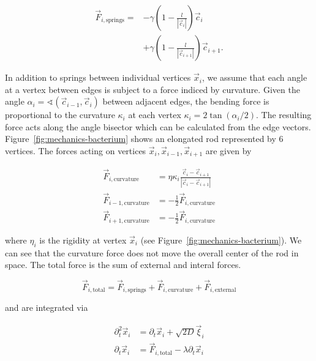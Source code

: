 \documentclass{article}
\begin{document}
\begin{align}
    \vec{F}_{i,\text{springs}} =
        &-\gamma\left(1 - \frac{l}{\left|\vec{c}_i\right|}\right)
        \vec{c}_i\\
        &+ \gamma\left(1 - \frac{l}{\left|\vec{c}_{i+1}\right|}\right)
        \vec{c}_{i+1}.
\end{align}

In addition to springs between individual vertices $\vec{x}_i$, we assume that each angle at a
vertex between edges is subject to a force indiced by curvature.
Given the angle $\alpha_i = \sphericalangle(\vec{c}_{i-1},\vec{c}_i)$ between adjacent edges,
the bending force is proportional to the curvature $\kappa_i$ at each vertex
$\kappa_i = 2\tan(\alpha_i/2)$.
The resulting force acts along the angle bisector which can be calculated from the edge vectors.
Figure~\ref{fig:mechanics-bacterium} shows an elongated rod represented by $6$ vertices.
The forces acting on vertices $\vec{x}_i,\vec{x}_{i-1},\vec{x}_{i+1}$ are given by

\begin{align}
    \vec{F}_{i,\text{curvature}} &= \eta\kappa_i
        \frac{\vec{c}_i - \vec{c}_{i+1}}{|\vec{c}_i-\vec{c}_{i+1}|}\\
    \vec{F}_{i-1,\text{curvature}} &= -\frac{1}{2}\vec{F}_{i,\text{curvature}}\\
    \vec{F}_{i+1,\text{curvature}} &= -\frac{1}{2}\vec{F}_{i,\text{curvature}}
\end{align}

where $\eta_i$ is the rigidity at vertex $\vec{x}_i$ (see Figure~\ref{fig:mechanics-bacterium}).
We can see that the curvature force does not move the overall center of the rod in space.
The total force is the sum of external and interal forces.

\begin{equation}
    \vec{F}_{i,\text{total}} = \vec{F}_{i,\text{springs}}+ \vec{F}_{i,\text{curvature}}
        + \vec{F}_{i,\text{external}}
\end{equation}

and are integrated via

\begin{align}
    \partial_t^2 \vec{x}_i &= \partial_t\vec{x}_i + \sqrt{2D}\vec{\xi}_i\\
    \partial_t\vec{x}_i &= \vec{F}_{i,\text{total}} - \lambda \partial_t\vec{x}_i
\end{align}
\end{document}
